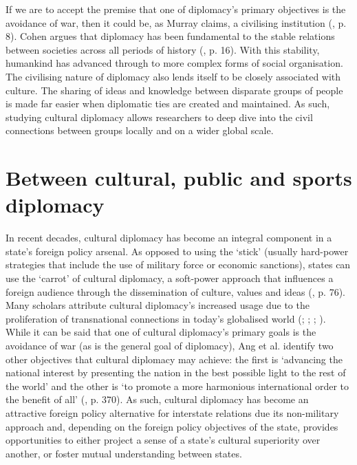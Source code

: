 If we are to accept the premise that one of diplomacy’s primary objectives is the avoidance of war, then it could be, as Murray claims, a civilising institution (\citeyear{murray2018}, p. 8). Cohen argues that diplomacy has been fundamental to the stable relations between societies across all periods of history (\citeyear{cohen2013}, p. 16). With this stability, humankind has advanced through to more complex forms of social organisation. The civilising nature of diplomacy also lends itself to be closely associated with culture. The sharing of ideas and knowledge between disparate groups of people is made far easier when diplomatic ties are created and maintained. As such, studying cultural diplomacy allows researchers to deep dive into the civil connections between groups locally and on a wider global scale.

\section{Between cultural, public and sports diplomacy}

In recent decades, cultural diplomacy has become an integral component in a state’s foreign policy arsenal. As opposed to using the ‘stick’ (usually hard-power strategies that include the use of military force or economic sanctions), states can use the ‘carrot’ of cultural diplomacy, a soft-power approach that influences a foreign audience through the dissemination of culture, values and ideas (\cite{lenczowski2009}, p. 76). Many scholars attribute cultural diplomacy’s increased usage due to the proliferation of transnational connections in today’s globalised world (\cite{snow2008}; \cite{ang2015}; \cite{hartig2016}; \cite{chitty2016}). While it can be said that one of cultural diplomacy’s primary goals is the avoidance of war (as is the general goal of diplomacy), Ang et al. identify two other objectives that cultural diplomacy may achieve:  the first is ‘advancing the national interest by presenting the nation in the best possible light to the rest of the world’ and the other is ‘to promote a more harmonious international order to the benefit of all’ (\citeyear{ang2015}, p. 370). As such, cultural diplomacy has become an attractive foreign policy alternative for interstate relations due its non-military approach and, depending on the foreign policy objectives of the state, provides opportunities to either project a sense of a state’s cultural superiority over another, or foster mutual understanding between states.

